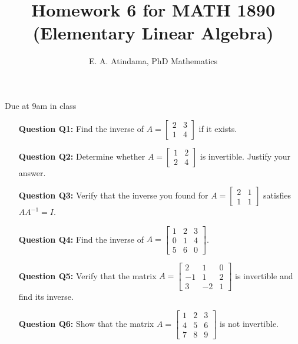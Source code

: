 \documentclass[a4paper,11pt,reqno]{amsart}
\title[MATH 1890 (Elementary Linear Algebra)]{Homework 6 for MATH 1890 (Elementary Linear Algebra)}
\author[Emmanuel Atindama]{E. A. Atindama, PhD Mathematics}
\numberwithin{equation}{section}
\begin{document}
\maketitle
Due at 9am in class
\vspace{0.5cm}

\begin{enumerate}
    \item[\textbf{Question Q1:}]  Find the inverse of \(A = \begin{bmatrix} 2 & 3 \\ 1 & 4 \end{bmatrix}\) if it exists.
    \item[\textbf{Question Q2:}]  Determine whether \(A = \begin{bmatrix} 1 & 2 \\ 2 & 4 \end{bmatrix}\) is invertible. Justify your answer.
    \item[\textbf{Question Q3:}]  Verify that the inverse you found for \(A = \begin{bmatrix} 2 & 1 \\ 1 & 1 \end{bmatrix}\) satisfies \(AA^{-1} = I\).
    \item[\textbf{Question Q4:}]  Find the inverse of \(A = \begin{bmatrix} 1 & 2 & 3 \\ 0 & 1 & 4 \\ 5 & 6 & 0 \end{bmatrix}\).
    \item[\textbf{Question Q5:}]  Verify that the matrix \(A = \begin{bmatrix} 2 & 1 & 0 \\ -1 & 1 & 2 \\ 3 & -2 & 1 \end{bmatrix}\) is invertible and find its inverse.
    \item[\textbf{Question Q6:}]  Show that the matrix \(A = \begin{bmatrix} 1 & 2 & 3 \\ 4 & 5 & 6 \\ 7 & 8 & 9 \end{bmatrix}\) is not invertible.
\end{enumerate}








\end{document}
